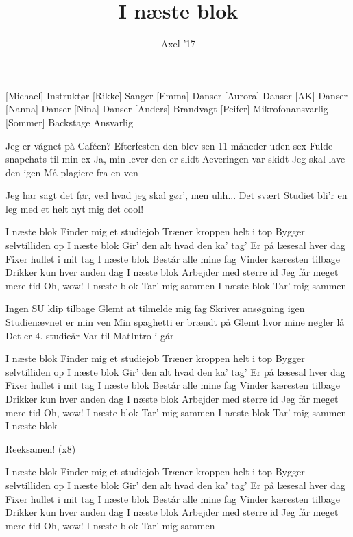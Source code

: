 \documentclass[a4paper,11pt]{article}
\title{I næste blok}
\author{Axel '17}
\begin{document}
\maketitle

\begin{roles}
[Michael] Instruktør
[Rikke] Sanger
[Emma] Danser
[Aurora] Danser
[AK] Danser
[Nanna] Danser
[Nina] Danser
[Anders] Brandvagt
[Peifer] Mikrofonansvarlig
[Sommer] Backstage Ansvarlig
\end{roles}

\begin{song}
 Jeg er vågnet på Caféen?
Efterfesten den blev sen
11 måneder uden sex
Fulde snapchats til min ex
Ja, min lever den er slidt
Aeveringen var skidt
Jeg skal lave den igen
Må plagiere fra en ven

 Jeg har sagt det før,
ved hvad jeg skal gør',
men uhh...
Det svært
Studiet bli'r en leg
med et helt nyt mig
det cool!

 I næste blok
Finder mig et studiejob
Træner kroppen helt i top
Bygger selvtilliden op
I næste blok
Gir' den alt hvad den ka' tag'
Er på læsesal hver dag
Fixer hullet i mit tag
I næste blok
Består alle mine fag
Vinder kæresten tilbage
Drikker kun hver anden dag
I næste blok
Arbejder med større id
Jeg får meget mere tid
Oh, wow!
I næste blok
Tar' mig sammen
I næste blok
Tar' mig sammen

 Ingen SU klip tilbage
Glemt at tilmelde mig fag
Skriver ansøgning igen
Studienævnet er min ven
Min spaghetti er brændt på
Glemt hvor mine nøgler lå
Det er 4. studieår
Var til MatIntro i går

 I næste blok
Finder mig et studiejob
Træner kroppen helt i top
Bygger selvtilliden op
I næste blok
Gir' den alt hvad den ka' tag'
Er på læsesal hver dag
Fixer hullet i mit tag
I næste blok
Består alle mine fag
Vinder kæresten tilbage
Drikker kun hver anden dag
I næste blok
Arbejder med større id
Jeg får meget mere tid
Oh, wow!
I næste blok
Tar' mig sammen
I næste blok
Tar' mig sammen
I næste blok

 Reeksamen! (x8)

 I næste blok
Finder mig et studiejob
Træner kroppen helt i top
Bygger selvtilliden op
I næste blok
Gir' den alt hvad den ka' tag'
Er på læsesal hver dag
Fixer hullet i mit tag
I næste blok
Består alle mine fag
Vinder kæresten tilbage
Drikker kun hver anden dag
I næste blok
Arbejder med større id
Jeg får meget mere tid
Oh, wow!
I næste blok
Tar' mig sammen
\end{song}
\end{document}
